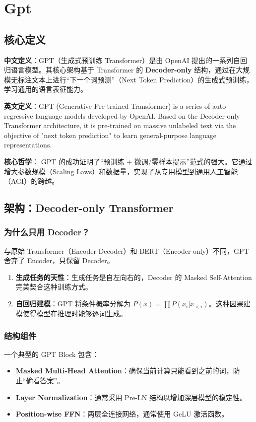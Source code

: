 \documentclass[12pt, a4paper]{book}
\begin{document}
\chapter{Gpt}


\section{核心定义}
\textbf{中文定义}：GPT（生成式预训练 Transformer）是由 OpenAI 提出的一系列自回归语言模型。其核心架构基于 Transformer 的 \textbf{Decoder-only} 结构，通过在大规模无标注文本上进行“下一个词预测”（Next Token Prediction）的生成式预训练，学习通用的语言表征能力。

\textbf{英文定义}：GPT (Generative Pre-trained Transformer) is a series of auto-regressive language models developed by OpenAI. Based on the Decoder-only Transformer architecture, it is pre-trained on massive unlabeled text via the objective of "next token prediction" to learn general-purpose language representations.

\textbf{核心哲学}：
GPT 的成功证明了“预训练 + 微调/零样本提示”范式的强大。它通过增大参数规模（Scaling Laws）和数据量，实现了从专用模型到通用人工智能（AGI）的跨越。

\section{架构：Decoder-only Transformer}

\subsection{为什么只用 Decoder？}
与原始 Transformer（Encoder-Decoder）和 BERT（Encoder-only）不同，GPT 舍弃了 Encoder，只保留 Decoder。
\begin{enumerate}
    \item \textbf{生成任务的天性}：生成任务是自左向右的，Decoder 的 Masked Self-Attention 完美契合这种训练方式。
    \item \textbf{自回归建模}：GPT 将条件概率分解为 $P(x) = \prod P(x_i | x_{<i})$。这种因果建模使得模型在推理时能够逐词生成。
\end{enumerate}

\subsection{结构组件}
一个典型的 GPT Block 包含：
\begin{itemize}
    \item \textbf{Masked Multi-Head Attention}：确保当前计算只能看到之前的词，防止“偷看答案”。
    \item \textbf{Layer Normalization}：通常采用 Pre-LN 结构以增加深层模型的稳定性。
    \item \textbf{Position-wise FFN}：两层全连接网络，通常使用 GeLU 激活函数。
\end{itemize}
\end{document}

